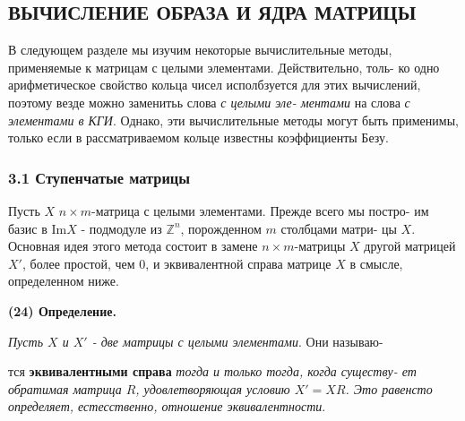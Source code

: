 \documentclass{mai_book}
\begin{document}
	\subsection {ВЫЧИСЛЕНИЕ ОБРАЗА И ЯДРА МАТРИЦЫ}
	
	В следующем разделе мы изучим некоторые вычислительные методы,\linebreak
	применяемые к матрицам с целыми элементами. Действительно, толь-\linebreak
	ко одно арифметическое свойство кольца чисел исполбзуется для\linebreak
	этих вычислений, поэтому везде можно заменитьь слова {\it с целыми эле-\linebreak
	ментами} на слова {\it с элементами в КГИ}. Однако, эти вычислительные\linebreak
	методы могут быть применимы, только если в рассматриваемом кольце\linebreak
	известны коэффициенты Безу.
	
	\subsubsection{3.1 Ступенчатые матрицы}
	
	Пусть $X$ $n\times m$-матрица с целыми элементами. Прежде всего мы постро-\linebreak
	им базис в  Im$X$ - подмодуле из ${\mathbb Z}^{n}$, порожденном $m$ столбцами матри-\linebreak
	цы $X$. Основная идея этого метода состоит в замене $n\times m$-матрицы\linebreak
	$X$ другой матрицей $X'$, более простой, чем 0, и эквивалентной справа\linebreak
	матрице $X$ в смысле, определенном ниже.\newline
	
	\noindent
	{\bf (24) Определение.}
	
	{\it Пусть $X$ и $X'$ - две матрицы с целыми элементами}. Они называю-\linebreak
	\pagebreak
	
	
	\noindent
	тся {\bf эквивалентными справа} {\it тогда и только тогда, когда существу-\linebreak
	ет обратимая матрица $R$, удовлетворяющая условию $X' = XR$. Это\linebreak
	равенсто определяет, естесственно, отношение эквивалентности}.\linebreak
\end{document}
